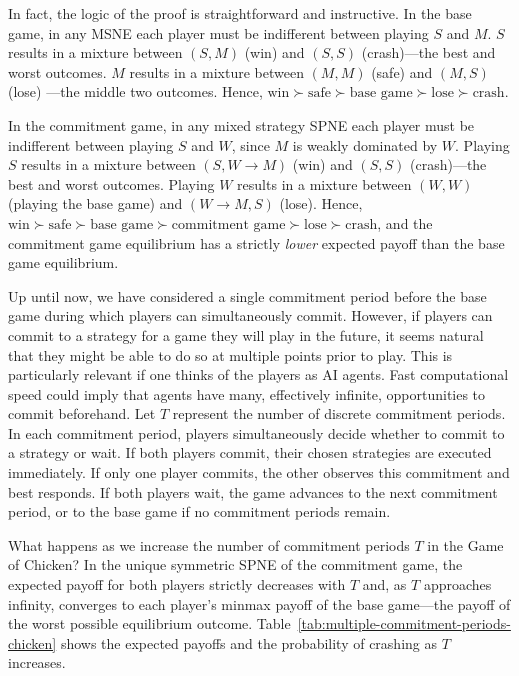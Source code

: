 \documentclass[letterpaper]{article}
\theoremstyle{definition}
\begin{document}

In fact, the logic of the proof is straightforward and instructive. In the base game, in any MSNE each player must be indifferent between playing $S$ and $M$. $S$ results in a mixture between $(S, M)$ (win) and $(S, S)$ (crash)—the best and worst outcomes. $M$ results in a mixture between $(M, M)$ (safe) and $(M, S)$ (lose) ---the middle two outcomes. Hence, $\text{win} \succ \text{safe} \succ \text{base game} \succ \text{lose} \succ \text{crash}$.

In the commitment game, in any mixed strategy SPNE each player must be indifferent between playing $S$ and $W$, since $M$ is weakly dominated by $W$. Playing $S$ results in a mixture between $(S, W \to M)$ (win) and $(S, S)$ (crash)—the best and worst outcomes. Playing $W$ results in a mixture between $(W, W)$ (playing the base game) and $(W \to M, S)$ (lose). Hence, $\text{win} \succ \text{safe} \succ \text{base game} \succ \text{commitment game} \succ \text{lose} \succ \text{crash}$, and the commitment game equilibrium has a strictly \emph{lower} expected payoff than the base game equilibrium.

Up until now, we have considered a single commitment period before the base game during which players can simultaneously commit. However, if players can commit to a strategy for a game they will play in the future, it seems natural that they might be able to do so at multiple points prior to play. This is particularly relevant if one thinks of the players as AI agents. Fast computational speed could imply that agents have many, effectively infinite, opportunities to commit beforehand.
Let $T$ represent the number of discrete commitment periods. In each commitment period, players simultaneously decide whether to commit to a strategy or wait. If both players commit, their chosen strategies are executed immediately. If only one player commits, the other observes this commitment and best responds. If both players wait, the game advances to the next commitment period, or to the base game if no commitment periods remain. 


What happens as we increase the number of commitment periods $T$ in the Game of Chicken? In the unique symmetric SPNE of the commitment game, the expected payoff for both players strictly decreases with $T$ and, as $T$ approaches infinity, converges to each player's minmax payoff of the base game---the payoff of the worst possible equilibrium outcome. Table~\ref{tab:multiple-commitment-periods-chicken} shows the expected payoffs and the probability of crashing as $T$ increases.
\end{document}
